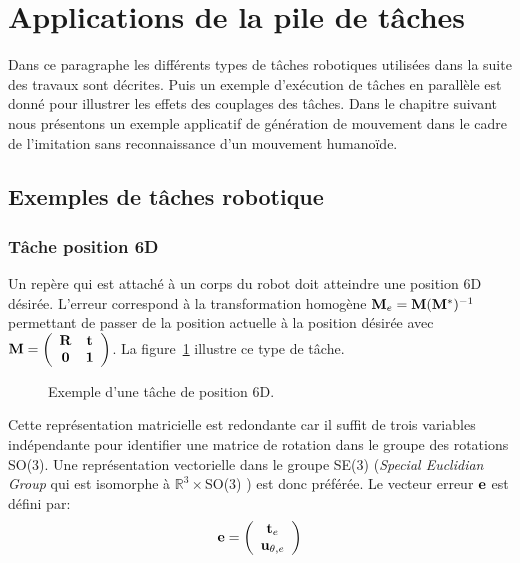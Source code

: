 \section{Applications de la pile de t\^aches}
Dans ce paragraphe les différents types de t\^aches robotiques utilisées dans la suite des travaux
sont décrites. Puis un exemple d'exécution de t\^aches en parallèle est donné pour
illustrer les effets des couplages des t\^aches.
Dans le chapitre suivant nous présentons un exemple applicatif de génération de 
mouvement dans le cadre de l'imitation sans reconnaissance d'un mouvement
humanoïde. 
\subsection{Exemples de t\^aches robotique}
\subsubsection{T\^ache position 6D}
Un repère qui est attaché à un corps du robot doit atteindre une position 6D désirée.
L'erreur correspond à la transformation homogène ${\mathbf{M}}_e = {\mathbf{M}}({\mathbf{M}}^*)^{-1}$ permettant de passer de la position
actuelle à la position désirée avec 
${\mathbf{M}} = \left( \begin{array}{cc} {\mathbf{R}}& {\mathbf{t}}\\ {\mathbf{0}} & {\mathbf{1}} \end{array} \right)$.
La figure~\ref{fig:feature6d} illustre ce type de t\^ache.
\begin{figure}[t]
  \begin{center}
    \resizebox{0.95\textwidth}{!}{
    
    }
  \end{center}
  \caption{Exemple d'une t\^ache de position 6D.}
  \label{fig:feature6d}
\end{figure}
Cette représentation matricielle est redondante car il suffit de trois variables
indépendante pour identifier une matrice de rotation dans le groupe des rotations
SO(3). Une représentation vectorielle dans le groupe SE(3) (\emph{Special Euclidian Group} qui 
est isomorphe à $\mathbb{R}^3 \times$SO(3) ) est donc préférée.
Le vecteur erreur ${\mathbf{e}}$ est défini par:
\begin{equation}
  \mbf{e} = \left( \begin{array}{c} \mbf{t}_e \\ \mbf{u}_{\theta, e} \end{array} \right)
  \label{eq:feature6dE}
\end{equation}
